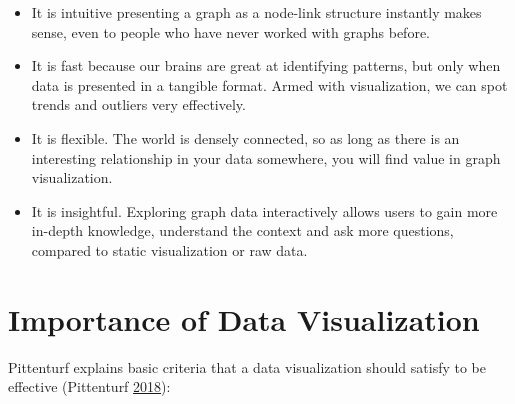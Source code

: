 \documentclass[]{book}
\providecommand{\tightlist}{%
  \setlength{\itemsep}{0pt}\setlength{\parskip}{0pt}}
\begin{document}
\begin{itemize}
\tightlist
\item
  It is intuitive presenting a graph as a node-link structure instantly
  makes sense, even to people who have never worked with graphs before.
\item
  It is fast because our brains are great at identifying patterns, but
  only when data is presented in a tangible format. Armed with
  visualization, we can spot trends and outliers very effectively.
\item
  It is flexible. The world is densely connected, so as long as there is
  an interesting relationship in your data somewhere, you will find
  value in graph visualization.
\item
  It is insightful. Exploring graph data interactively allows users to
  gain more in-depth knowledge, understand the context and ask more
  questions, compared to static visualization or raw data.
\end{itemize}

\section{Importance of Data
Visualization}\label{importance-of-data-visualization}

Pittenturf explains basic criteria that a data visualization should
satisfy to be effective (Pittenturf
\protect\hyperlink{ref-viz_importance}{2018}):
\end{document}
